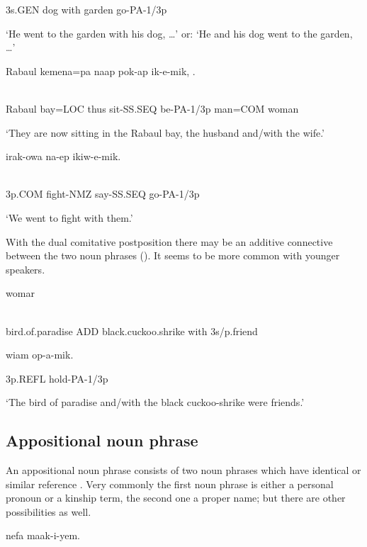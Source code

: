 3s.GEN  dog  with  garden  go-PA-1/3p

`He went to the garden with his dog, {\dots}' or: `He and his dog went to the garden, {\dots}'

\ea%
\label{ex:x832}
\gll Rabaul  kemena=pa  naap  pok-ap  ik-e-mik,  . \\
      \\
\glt
\z

Rabaul  bay=LOC  thus  sit-SS.SEQ  be-PA-1/3p  man=COM  woman

`They are now sitting in the Rabaul bay, the husband and/with the wife.'

\ea%
\label{ex:x831}
\gll {}  irak-owa  na-ep  ikiw-e-mik. \\
      \\
\glt
\z

3p.COM  fight-NMZ  say-SS.SEQ  go-PA-1/3p

`We went to fight with them.'

With the dual comitative postposition   there may be an additive connective  between the two noun phrases (). It seems to be more common with younger speakers. 

\ea%
\label{ex:x820}
\gll {}  womar  \\
      \\
\glt
\z

bird.of.paradise  ADD  black.cuckoo.shrike  with  3s/p.friend  

wiam  op-a-mik.

3p.REFL  hold-PA-1/3p

`The bird of paradise and/with the black cuckoo-shrike were friends.'

\subsection{Appositional noun phrase}
{}
An appositional noun phrase consists of two noun phrases which have identical or similar reference \citep[24]{Crystal1997}.  Very commonly the first noun phrase is either a personal pronoun or a kinship term, the second one a proper name; but there are other possibilities as well.  

\ea%
\label{ex:x835}
\gll {}  nefa  maak-i-yem. \\
      \\
\glt
\z

